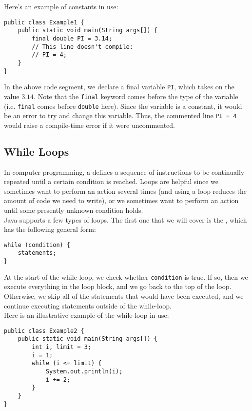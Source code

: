 Here's an example of constants in use: \\

\begin{lstlisting}
public class Example1 {
    public static void main(String args[]) {
        final double PI = 3.14;
        // This line doesn't compile:
        // PI = 4;
    }
}
\end{lstlisting}

In the above code segment, we declare a final variable \verb!PI!, which takes on the value $3.14$. Note that the \verb!final! keyword comes before the type of the variable (i.e. \verb!final! comes before \verb!double! here). Since the variable is a constant, it would be an error to try and change this variable. Thus, the commented line \verb!PI = 4! would raise a compile-time error if it were uncommented. 


\subsection{While Loops}

In computer programming, a  defines a sequence of instructions to be continually repeated until a certain condition is reached. Loops are helpful since we sometimes want to perform an action several times (and using a loop reduces the amount of code we need to write), or we sometimes want to perform an action until some presently unknown condition holds. \\

Java supports a few types of loops. The first one that we will cover is the , which has the following general form:

\begin{lstlisting}
while (condition) {
    statements;
}
\end{lstlisting}

At the start of the while-loop, we check whether \verb!condition! is true. If so, then we execute everything in the loop block, and we go back to the top of the loop. Otherwise, we skip all of the statements that would have been executed, and we continue executing statements outside of the while-loop. \\


Here is an illustrative example of the while-loop in use:

\begin{lstlisting}
public class Example2 {
    public static void main(String args[]) {
        int i, limit = 3;
        i = 1;
        while (i <= limit) {
            System.out.println(i);
            i += 2;
        }
    }
}
\end{lstlisting}

